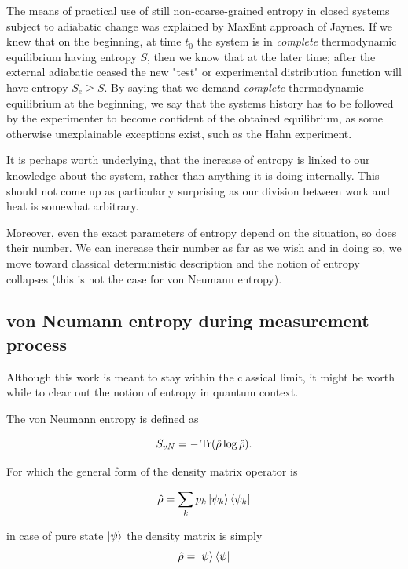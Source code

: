 \documentclass[a4paper,12pt]{article}
\begin{document}
The means of practical use of still non-coarse-grained entropy in closed systems subject to adiabatic change was explained by MaxEnt approach of Jaynes\cite{Jaynes:1965gg}. If we knew that on the beginning, at time $t_0$ the system is in \textit{complete} thermodynamic equilibrium having entropy $S$, then we know that at the later time; after the external adiabatic ceased the new "test" or experimental distribution function will have entropy $S_e \geq S$. By saying that we demand \textit{complete} thermodynamic equilibrium at the beginning, we say that the systems history has to be followed by the experimenter to become confident of the obtained equilibrium, as some otherwise unexplainable exceptions exist, such as the Hahn experiment. %

It is perhaps worth underlying, that the increase of entropy is linked to our knowledge about the system, rather than anything it is doing internally. This should not come up as particularly surprising as our division between work and heat is somewhat arbitrary.

Moreover, even the exact parameters of entropy depend on the situation, so does their number. We can increase their number as far as we wish and in doing so, we move toward classical deterministic description and the notion of entropy collapses (this is not the case for von Neumann entropy).

\subsection{von Neumann entropy during measurement process}

Although this work is meant to stay within the classical limit, it might be worth while to clear out the notion of entropy in quantum context.

The von Neumann entropy is defined as 

\begin{equation}
  S_{vN}= -\Tr(\hat{\rho} \log{\hat{\rho}}).
\end{equation}

For which the general form of the density matrix operator is

\begin{equation}
	\hat{\rho}=\sum_k p_k \ket{\psi_k}\bra{\psi_k} 
\end{equation}

in case of pure state $\ket{\psi}$ the density matrix is simply
\begin{equation}
  \hat{\rho} = \ket{\psi}\bra{\psi}
\end{equation}
\end{document}
